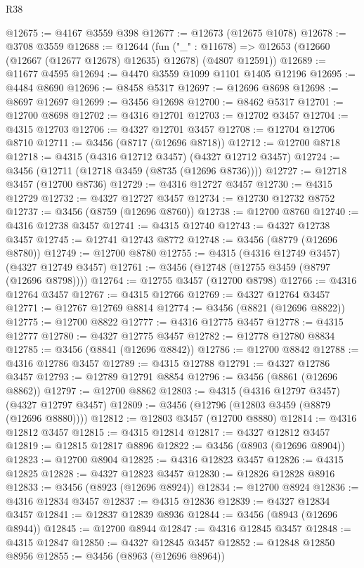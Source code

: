 \begin{lexlean}{R38}
\begin{coremodule}
@12675 := @4167 @3559 @398
@12677 := @12673 (@12675 @1078)
@12678 := @3708 @3559
@12688 := @12644
    (fun ("_" : @11678) => @12653 (@12660 (@12667 (@12677 @12678) @12635) @12678) (@4807 @12591))
@12689 := @11677 @4595
@12694 := @4470 @3559 @1099 @1101 @1405 @12196
@12695 := @4484 @8690
@12696 := @8458 @5317
@12697 := @12696 @8698
@12698 := @8697 @12697
@12699 := @3456 @12698
@12700 := @8462 @5317
@12701 := @12700 @8698
@12702 := @4316 @12701
@12703 := @12702 @3457
@12704 := @4315 @12703
@12706 := @4327 @12701 @3457
@12708 := @12704 @12706 @8710
@12711 := @3456 (@8717 (@12696 @8718))
@12712 := @12700 @8718
@12718 := @4315 (@4316 @12712 @3457) (@4327 @12712 @3457)
@12724 := @3456 (@12711 (@12718 @3459 (@8735 (@12696 @8736))))
@12727 := @12718 @3457 (@12700 @8736)
@12729 := @4316 @12727 @3457
@12730 := @4315 @12729
@12732 := @4327 @12727 @3457
@12734 := @12730 @12732 @8752
@12737 := @3456 (@8759 (@12696 @8760))
@12738 := @12700 @8760
@12740 := @4316 @12738 @3457
@12741 := @4315 @12740
@12743 := @4327 @12738 @3457
@12745 := @12741 @12743 @8772
@12748 := @3456 (@8779 (@12696 @8780))
@12749 := @12700 @8780
@12755 := @4315 (@4316 @12749 @3457) (@4327 @12749 @3457)
@12761 := @3456 (@12748 (@12755 @3459 (@8797 (@12696 @8798))))
@12764 := @12755 @3457 (@12700 @8798)
@12766 := @4316 @12764 @3457
@12767 := @4315 @12766
@12769 := @4327 @12764 @3457
@12771 := @12767 @12769 @8814
@12774 := @3456 (@8821 (@12696 @8822))
@12775 := @12700 @8822
@12777 := @4316 @12775 @3457
@12778 := @4315 @12777
@12780 := @4327 @12775 @3457
@12782 := @12778 @12780 @8834
@12785 := @3456 (@8841 (@12696 @8842))
@12786 := @12700 @8842
@12788 := @4316 @12786 @3457
@12789 := @4315 @12788
@12791 := @4327 @12786 @3457
@12793 := @12789 @12791 @8854
@12796 := @3456 (@8861 (@12696 @8862))
@12797 := @12700 @8862
@12803 := @4315 (@4316 @12797 @3457) (@4327 @12797 @3457)
@12809 := @3456 (@12796 (@12803 @3459 (@8879 (@12696 @8880))))
@12812 := @12803 @3457 (@12700 @8880)
@12814 := @4316 @12812 @3457
@12815 := @4315 @12814
@12817 := @4327 @12812 @3457
@12819 := @12815 @12817 @8896
@12822 := @3456 (@8903 (@12696 @8904))
@12823 := @12700 @8904
@12825 := @4316 @12823 @3457
@12826 := @4315 @12825
@12828 := @4327 @12823 @3457
@12830 := @12826 @12828 @8916
@12833 := @3456 (@8923 (@12696 @8924))
@12834 := @12700 @8924
@12836 := @4316 @12834 @3457
@12837 := @4315 @12836
@12839 := @4327 @12834 @3457
@12841 := @12837 @12839 @8936
@12844 := @3456 (@8943 (@12696 @8944))
@12845 := @12700 @8944
@12847 := @4316 @12845 @3457
@12848 := @4315 @12847
@12850 := @4327 @12845 @3457
@12852 := @12848 @12850 @8956
@12855 := @3456 (@8963 (@12696 @8964))

\end{coremodule}
\end{lexlean}
